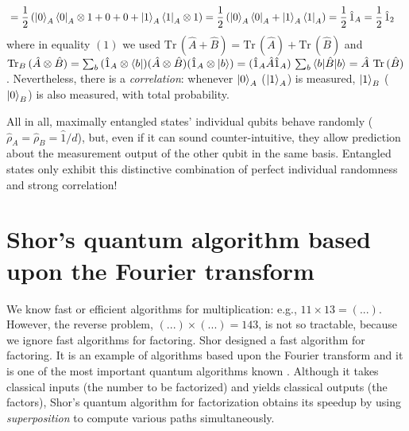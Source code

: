 \documentclass[11pt]{article}
\numberwithin{equation}{section} %
\numberwithin{figure}{section} %
\begin{document}
\begin{appendices}
\begin{equation}
\begin{split}
&=\frac{1}{2}\left( \ket{0}_A\bra{0}_A\otimes 1+0+0+\ket{1}_A\bra{1}_A\otimes 1 \right)=\frac{1}{2}\left( \ket{0}_A\bra{0}_A+\ket{1}_A\bra{1}_A\right)=\frac{1}{2}\,\hat{1}_{A}=\frac{1}{2}\,\hat{1}_{2}
\end{split}
\end{equation}
where in equality $(1)$ we used $\textrm{Tr}\,(\hat{A}+\hat{B})=\textrm{Tr}\,(\hat{A})+\textrm{Tr}\,(\hat{B})$ and \cite[p.~105, Eq.~(2.178)]{Nielsen} $\textrm{Tr}_B\,(\hat{A}\otimes\hat{B})=\sum_b\,(\hat{1}_A\otimes\bra{b})(\hat{A}\otimes\hat{B})(\hat{1}_A\otimes\ket{b})=(\hat{1}_A\hat{A}\hat{1}_A)\,\sum_b\braket{b|\hat{B}|b}=\hat{A}\,\,\textrm{Tr}\,(\hat{B})$. Nevertheless, there is a \emph{correlation}: whenever $\ket{0}_A$ ($\ket{1}_A$) is measured, $\ket{1}_B$ ($\ket{0}_B$) is also measured, with total probability.

All in all, maximally entangled states' individual qubits behave randomly ($\hat{\rho}_A=\hat{\rho}_B=\hat{1}/d$), but, even if it can sound counter-intuitive, they allow prediction about the measurement output of the other qubit in the same basis. Entangled states only exhibit this distinctive combination of perfect individual randomness and strong correlation!


    
   


\vspace{1cm}
\section{Shor's quantum algorithm based upon the Fourier transform} \label{Quantum_Fourier_transform}

We know fast or efficient algorithms for multiplication: e.g., $11\times 13=(...)$. However, the reverse problem, $(...)\times(...)=143$, is not so tractable, because we ignore fast algorithms for factoring. Shor designed a fast algorithm for factoring. It is an example of algorithms based upon the Fourier transform and it is one of the most important quantum algorithms known \cite[p.~37, l.~25]{Nielsen}. Although it takes classical inputs (the number to be factorized) and yields classical outputs (the factors), Shor's quantum algorithm for factorization obtains its speedup by using \emph{superposition} to compute various paths simultaneously.



\end{appendices}
\end{document}
